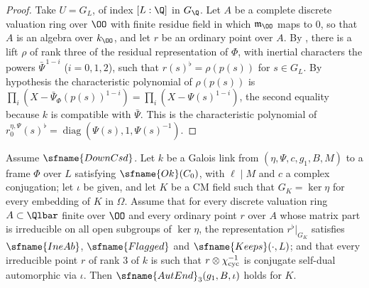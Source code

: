 \begin{proof}
Take $U=G_L$, of index $[L:\Q]$ in $G_\Q$. Let $A$ be a complete discrete valuation ring over $\OO$ with finite residue
field in which $\mathfrak m_\OO$ maps to $0$, so that $A$ is an algebra over $k_\OO$, and let $r$ be an ordinary point
over $A$. By , there is a lift $\rho$ of rank three of the residual
representation of $\Phi$, with inertial characters the powers $\bar\Psi^{\,1-i}$ ($i=0,1,2$), such that
$r(s)^\flat=\rho(p(s))$ for $s\in G_L$. By hypothesis the characteristic polynomial of $\rho(p(s))$ is
$\prod_i(X-\bar\Psi_\Phi(p(s))^{1-i})=\prod_i(X-\Psi(s)^{1-i})$, the second equality because $k$ is compatible with
$\bar\Psi$. This is the characteristic polynomial of $r_0^{\eta,\Psi}(s)^\flat=\operatorname{diag}(\Psi(s),1,\Psi(s)^{-1})$.
\end{proof}

\begin{lemma}\label{pf:modularity:autend3}
Assume $\sfname{DownCsd}$. Let $k$ be a Galois link from $(\eta,\Psi,c,g_1,B,M)$ to a frame $\Phi$ over $L$ satisfying
$\sfname{Ok}(C_0)$, with $\ell\mid M$ and $c$ a complex conjugation; let $\iota$ be given, and let $K$ be a CM field such
that $G_K=\ker\eta$ for every embedding of $K$ in $\Omega$. Assume that for every discrete valuation ring
$A\subset\Qlbar$ finite over $\OO$ and every ordinary point $r$ over $A$ whose matrix part is irreducible on all open
subgroups of $\ker\eta$, the representation $r^\flat|_{G_K}$ satisfies $\sfname{IneAb}$, $\sfname{Flagged}$ and
$\sfname{Keeps}(\cdot,L)$; and that every irreducible point $r$ of rank $3$ of $k$ is such that
$r\otimes\chi_{\mathrm{cyc}}^{-1}$ is conjugate self-dual automorphic via $\iota$. Then $\sfname{AutEnd}_3(g_1,B,\iota)$ holds for
$K$.
\end{lemma}

